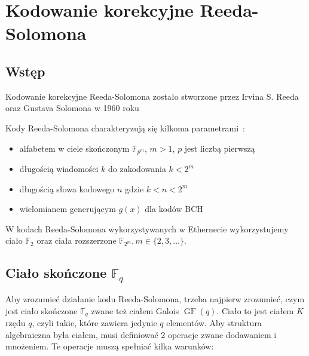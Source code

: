 \section{Kodowanie korekcyjne Reeda-Solomona}
\subsection{Wstęp}

Kodowanie korekcyjne Reeda-Solomona zostało stworzone przez Irvina S. Reeda
oraz Gustava Solomona w 1960 roku~\cite{Reed-Solomon-original}

Kody Reeda-Solomona charakteryzują się kilkoma parametrami~\cite{Reed-Solomon-Encoding-Decoding}:
\begin{itemize}
    \item alfabetem w ciele skończonym $\mathbb{F}_{p^m}$, $m>1$, $p$ jest liczbą
    pierwszą
    \item długością wiadomości $k$ do zakodowania $k < 2^{m}$
    \item długością słowa kodowego $n$ gdzie $k < n < 2^{m}$
    \item wielomianem generującym $g(x)$ dla kodów BCH
\end{itemize}

W kodach Reeda-Solomona wykorzystywanych w Ethernecie wykorzystujemy ciało $\mathbb{F}_2$ oraz ciała rozszerzone
$\mathbb{F}_{2^m}, m \in \{ 2, 3, \ldots \}$.

\subsection{Ciało skończone $\mathbb{F}_{q}$}

Aby zrozumieć działanie kodu Reeda-Solomona, trzeba najpierw zrozumieć, czym jest
ciało skończone $\mathbb{F}_q$ zwane też ciałem Galois $\operatorname{GF}(q)$.
Ciało to jest ciałem $K$ rzędu $q$, czyli takie, które zawiera jedynie $q$ elementów.
Aby struktura algebraiczna była ciałem, musi definiować 2 operacje zwane
dodawaniem i mnożeniem.
Te operacje muszą spełniać kilka warunków:

